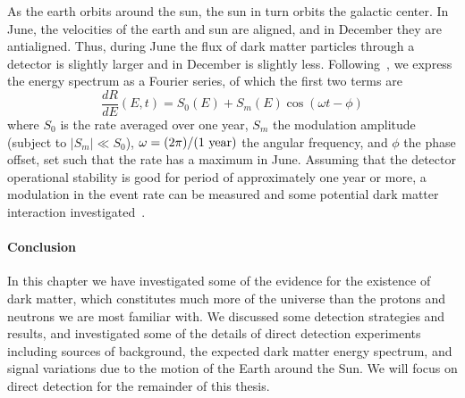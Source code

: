 As the earth orbits around the sun, the sun in turn orbits the galactic center. In June, the velocities of the earth and sun are aligned, and in December they are antialigned. Thus, during June the flux of dark matter particles through a detector is slightly larger and in December is slightly less. Following~\cite{Freese:2012xd}, we express the energy spectrum as a Fourier series, of which the first two terms are
\begin{equation}\label{eq:modulation}
\frac{dR}{dE}(E,t) = S_0(E) + S_m(E)\cos (\omega t - \phi)
\end{equation}
where $S_0$ is the rate averaged over one year, $S_m$ the modulation amplitude (subject to $|S_m| \ll S_0$), $\omega = (2\pi)/(1~\mathrm{year})$ the angular frequency, and $\phi$ the phase offset, set such that the rate has a maximum in June. Assuming that the detector operational stability is good for period of approximately one year or more, a modulation in the event rate can be measured and some potential dark matter interaction investigated~\cite{Aprile:2017yea,Abe:2018mxq}.

\paragraph{Conclusion} In this chapter we have investigated some of the evidence for the existence of dark matter, which constitutes much more of the universe than the protons and neutrons we are most familiar with. We discussed some detection strategies and results, and investigated some of the details of direct detection experiments including sources of background, the expected dark matter energy spectrum, and signal variations due to the motion of the Earth around the Sun. We will focus on direct detection for the remainder of this thesis.